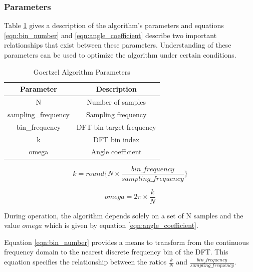 \subsubsection{Parameters}
\label{sec:goertzel_parameters}
Table \ref{tbl:goertzel_algorithm_parameters} gives a description of the algorithm's parameters and equations \ref{eqn:bin_number} and \ref{eqn:angle_coefficient} describe two important relationships that exist between these parameters. Understanding of these parameters can be used to optimize the algorithm under certain conditions.

\begin{table}[H]
	\centering
	\begin{tabular}{cc}
		\hline
		\textbf{Parameter} & \textbf{Description} \\ \hline
		N & Number of samples \\ \hline
		sampling\_frequency & Sampling frequency \\ \hline
		bin\_frequency & DFT bin target frequency \\ \hline
		k & DFT bin index \\ \hline
		omega & Angle coefficient \\ \hline
	\end{tabular}
	\caption{Goertzel Algorithm Parameters}
	\label{tbl:goertzel_algorithm_parameters}
\end{table}

\begin{equation}
k = round\{N \times \frac{bin\_frequency}{sampling\_frequency}\}
\label{eqn:bin_number}
\end{equation}

\begin{equation}
omega = 2\pi \times \frac{k}{N}
\label{eqn:angle_coefficient}
\end{equation}


During operation, the algorithm depends solely on a set of N samples and the value $omega$ which is given by equation \ref{eqn:angle_coefficient}.

Equation \ref{eqn:bin_number} provides a means to transform from the continuous frequency domain to the nearest discrete frequency bin of the DFT. This equation specifies the relationship between the ratios $\frac{k}{N}$ and $\frac{bin\_frequency}{sampling\_frequency}$.








